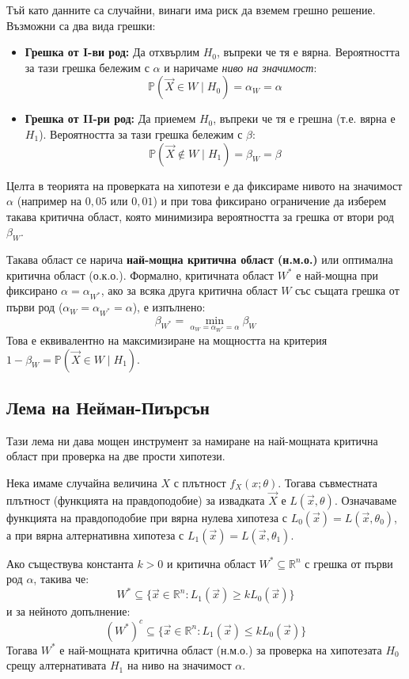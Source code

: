 \documentclass{article}
\begin{document}
Тъй като данните са случайни, винаги има риск да вземем грешно решение. Възможни са два вида грешки:
\begin{itemize}
    \item \textbf{Грешка от I-ви род:} Да отхвърлим $H_0$, въпреки че тя е вярна. Вероятността за тази грешка бележим с $\alpha$ и наричаме \textit{ниво на значимост}:
    \[
    \mathbb{P}(\vec{X} \in W \mid H_0) = \alpha_W = \alpha
    \]
    \item \textbf{Грешка от II-ри род:} Да приемем $H_0$, въпреки че тя е грешна (т.е. вярна е $H_1$). Вероятността за тази грешка бележим с $\beta$:
    \[
    \mathbb{P}(\vec{X} \notin W \mid H_1) = \beta_W = \beta
    \]
\end{itemize}
Целта в теорията на проверката на хипотези е да фиксираме нивото на значимост $\alpha$ (например на $0,05$ или $0,01$) и при това фиксирано ограничение да изберем такава критична област, която минимизира вероятността за грешка от втори род $\beta_W$. 

Такава област се нарича \textbf{най-мощна критична област (н.м.о.)} или оптимална критична област (о.к.о.). Формално, критичната област $W^*$ е най-мощна при фиксирано $\alpha = \alpha_{W^*}$, ако за всяка друга критична област $W$ със същата грешка от първи род ($\alpha_W = \alpha_{W^*} = \alpha$), е изпълнено:
\[
\beta_{W^*} = \min_{\alpha_W = \alpha_{W^*} = \alpha} \beta_W
\]
Това е еквивалентно на максимизиране на мощността на критерия $1 - \beta_W = \mathbb{P}(\vec{X} \in W \mid H_1)$.

\subsection{Лема на Нейман-Пиърсън}
Тази лема ни дава мощен инструмент за намиране на най-мощната критична област при проверка на две прости хипотези.

Нека имаме случайна величина $X$ с плътност $f_X(x; \theta)$. Тогава съвместната плътност (функцията на правдоподобие) за извадката $\vec{X}$ е $L(\vec{x}, \theta)$. Означаваме функцията на правдоподобие при вярна нулева хипотеза с $L_0(\vec{x}) = L(\vec{x}, \theta_0)$, а при вярна алтернативна хипотеза с $L_1(\vec{x}) = L(\vec{x}, \theta_1)$.

Ако съществува константа $k > 0$ и критична област $W^* \subseteq \mathbb{R}^n$ с грешка от първи род $\alpha$, такива че:
\[
W^* \subseteq \{ \vec{x} \in \mathbb{R}^n : L_1(\vec{x}) \ge k L_0(\vec{x}) \}
\]
и за нейното допълнение:
\[
(W^*)^c \subseteq \{ \vec{x} \in \mathbb{R}^n : L_1(\vec{x}) \le k L_0(\vec{x}) \}
\]
Тогава $W^*$ е най-мощната критична област (н.м.о.) за проверка на хипотезата $H_0$ срещу алтернативата $H_1$ на ниво на значимост $\alpha$.
\end{document}
